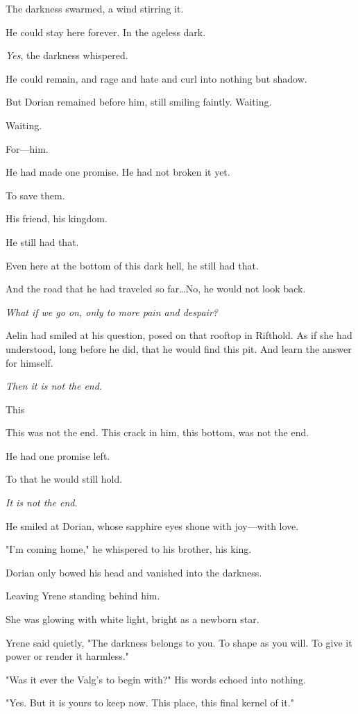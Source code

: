 The darkness swarmed, a wind stirring it.

He could stay here forever.
In the ageless dark.

\emph{Yes}, the darkness whispered.

He could remain, and rage and hate and curl into nothing but shadow.

But Dorian remained before him, still smiling faintly.
Waiting.

Waiting.

For---him.

He had made one promise.
He had not broken it yet.

To save them.

His friend, his kingdom.

He still had that.

Even here at the bottom of this dark hell, he still had that.

And the road that he had traveled so far\ldots No, he would not look back.

\emph{What if we go on, only to more pain and despair?}

Aelin had smiled at his question, posed on that rooftop in Rifthold.
As if she had understood, long before he did, that he would find this pit.
And learn the answer for himself.

\emph{Then it is not the end}.

This 

This was not the end.
This crack in him, this bottom, was not the end.

He had one promise left.

To that he would still hold.

\emph{It is not the end}.

He smiled at Dorian, whose sapphire eyes shone with joy---with love.

"I'm coming home," he whispered to his brother, his king.

Dorian only bowed his head and vanished into the darkness.

Leaving Yrene standing behind him.

She was glowing with white light, bright as a newborn star.

Yrene said quietly, "The darkness belongs to you.
To shape as you will.
To give it power or render it harmless."

"Was it ever the Valg's to begin with?"
His words echoed into nothing.

"Yes.
But it is yours to keep now.
This place, this final kernel of it."

